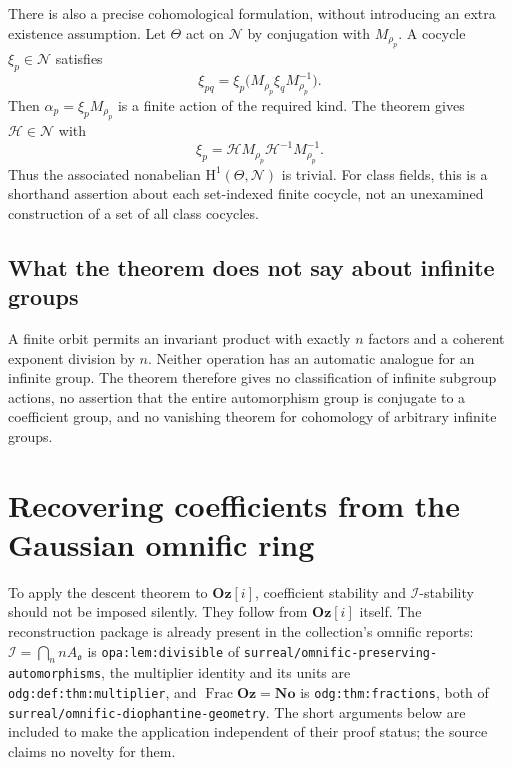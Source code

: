 \documentclass[11pt]{article}
\theoremstyle{definition}
\theoremstyle{remark}
\newcommand{\No}{\mathbf{No}}
\newcommand{\repo}[1]{\nolinkurl{#1}}%
\newcommand{\lbl}[1]{\nolinkurl{#1}}%
\newcommand{\Oz}{\mathbf{Oz}}
\newcommand{\Frac}{\operatorname{Frac}}
\newcommand{\Ineg}{\mathcal I}
\numberwithin{equation}{section}
\begin{document}
There is also a precise cohomological formulation, without introducing an extra
existence assumption. Let $\Theta$ act on $\mathcal N$ by conjugation with
$M_{\rho_p}$. A cocycle $\xi_p\in\mathcal N$ satisfies
\[
 \xi_{pq}=\xi_p\bigl(M_{\rho_p}\xi_qM_{\rho_p}^{-1}\bigr).
\]
Then $\alpha_p=\xi_pM_{\rho_p}$ is a finite action of the required kind. The theorem
gives $\mathcal H\in\mathcal N$ with
\[
 \xi_p=\mathcal HM_{\rho_p}\mathcal H^{-1}M_{\rho_p}^{-1}.
\]
Thus the associated nonabelian $\mathrm H^1(\Theta,\mathcal N)$ is trivial. For class
fields, this is a shorthand assertion about each set-indexed finite cocycle, not an
unexamined construction of a set of all class cocycles.

\subsection{What the theorem does not say about infinite groups}

A finite orbit permits an invariant product with exactly $n$ factors and a coherent
exponent division by $n$. Neither operation has an automatic analogue for an
infinite group. The theorem therefore gives no classification of infinite subgroup
actions, no assertion that the entire automorphism group is conjugate to a
coefficient group, and no vanishing theorem for cohomology of arbitrary infinite
groups.

\section{Recovering coefficients from the Gaussian omnific ring}\label{saut:fs:sec:recovery}

To apply the descent theorem to $\Oz[i]$, coefficient stability and
$\Ineg$-stability should not be imposed silently. They follow from $\Oz[i]$ itself.
The reconstruction package is already present in the collection's omnific reports:
$\Ineg=\bigcap_nnA_{\mathfrak o}$ is \lbl{opa:lem:divisible} of
\repo{surreal/omnific-preserving-automorphisms}, the multiplier identity and its units
are \lbl{odg:def:thm:multiplier}, and $\Frac\Oz=\No$ is \lbl{odg:thm:fractions}, both
of \repo{surreal/omnific-diophantine-geometry}. The short arguments below are included
to make the application independent of their proof status; the source claims no
novelty for them.
\end{document}
